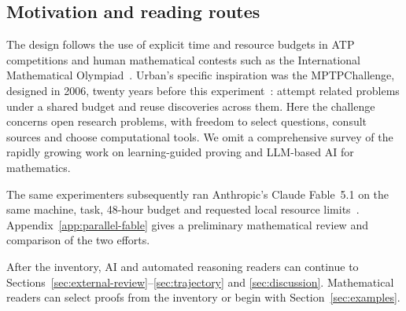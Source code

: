 \subsection{Motivation and reading routes}

The design follows the use of explicit time and resource budgets in ATP
competitions and human mathematical contests such as the International
Mathematical Olympiad~\cite{imo-regulations}. Urban's specific inspiration
was the MPTPChallenge, designed in 2006, twenty years before this
experiment~\cite{mptpchallenge}: attempt related problems under a shared
budget and reuse discoveries across them. Here the challenge concerns
open research problems, with freedom to select questions, consult sources
and choose computational tools. We omit a comprehensive survey of the
rapidly growing work on learning-guided proving and LLM-based AI for
mathematics.

The same experimenters subsequently ran Anthropic's Claude Fable~5.1
on the same machine, task, 48-hour budget and requested local resource
limits~\cite{fable-kourovka}. Appendix~\ref{app:parallel-fable} gives
a preliminary mathematical review and comparison of the two efforts.

After the inventory, AI and automated reasoning readers can continue to
Sections~\ref{sec:external-review}--\ref{sec:trajectory} and
\ref{sec:discussion}. Mathematical readers can select proofs from the
inventory or begin with Section~\ref{sec:examples}.
